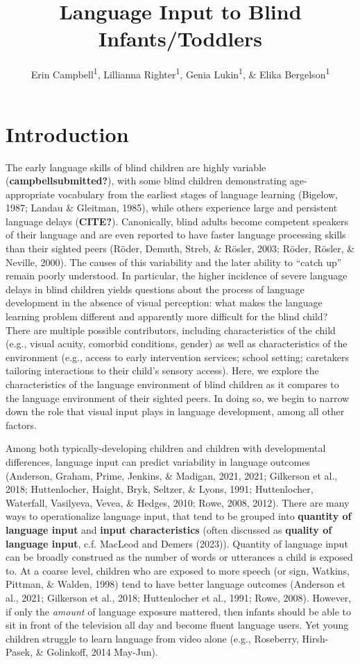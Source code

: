 \documentclass[
  man,floatsintext]{apa6}
\title{Language Input to Blind Infants/Toddlers}
\author{Erin Campbell\textsuperscript{1}, Lillianna Righter\textsuperscript{1}, Genia Lukin\textsuperscript{1}, \& Elika Bergelson\textsuperscript{1}}
\date{}
\affiliation{\vspace{0.5cm}\textsuperscript{1} Department of Psychology \& Neuroscience, Duke University, Durham, NC}
\begin{document}
\maketitle

\hypertarget{introduction}{%
\section{Introduction}\label{introduction}}

The early language skills of blind children are highly variable (\textbf{campbellsubmitted?}), with some blind children demonstrating age-appropriate vocabulary from the earliest stages of language learning (Bigelow, 1987; Landau \& Gleitman, 1985), while others experience large and persistent language delays (\textbf{CITE?}). Canonically, blind adults become competent speakers of their language and are even reported to have faster language processing skills than their sighted peers (Röder, Demuth, Streb, \& Rösler, 2003; Röder, Rösler, \& Neville, 2000). The causes of this variability and the later ability to ``catch up'' remain poorly understood. In particular, the higher incidence of severe language delays in blind children yields questions about the process of language development in the absence of visual perception: what makes the language learning problem different and apparently more difficult for the blind child? There are multiple possible contributors, including characteristics of the child (e.g., visual acuity, comorbid conditions, gender) as well as characteristics of the environment (e.g., access to early intervention services; school setting; caretakers tailoring interactions to their child's sensory access). Here, we explore the characteristics of the language environment of blind children as it compares to the language environment of their sighted peers. In doing so, we begin to narrow down the role that visual input plays in language development, among all other factors.

Among both typically-developing children and children with developmental differences, language input can predict variability in language outcomes (Anderson, Graham, Prime, Jenkins, \& Madigan, 2021, 2021; Gilkerson et al., 2018; Huttenlocher, Haight, Bryk, Seltzer, \& Lyons, 1991; Huttenlocher, Waterfall, Vasilyeva, Vevea, \& Hedges, 2010; Rowe, 2008, 2012). There are many ways to operationalize language input, that tend to be grouped into \textbf{quantity of language input} and \textbf{input characteristics} (often discussed as \textbf{quality of language input}, c.f. MacLeod and Demers (2023)). Quantity of language input can be broadly construed as the number of words or utterances a child is exposed to. At a coarse level, children who are exposed to more speech (or sign, Watkins, Pittman, \& Walden, 1998) tend to have better language outcomes (Anderson et al., 2021; Gilkerson et al., 2018; Huttenlocher et al., 1991; Rowe, 2008). However, if only the \emph{amount} of language exposure mattered, then infants should be able to sit in front of the television all day and become fluent language users. Yet young children struggle to learn language from video alone (e.g., Roseberry, Hirsh-Pasek, \& Golinkoff, 2014 May-Jun).
\end{document}
